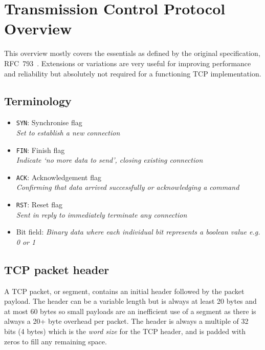 
\section[TCP Overview]{Transmission Control Protocol Overview}
    This overview mostly covers the essentials as defined by the original specification, RFC~793~\cite{rfc793}. Extensions or variations are very useful for improving performance and reliability but absolutely not required for a functioning \gls{TCP} implementation. %

    \subsection{Terminology}
        \begin{itemize}
            \item \texttt{SYN}: Synchronise flag\\
                \textit{Set to establish a new connection}
            \item \texttt{FIN}: Finish flag\\
                \textit{Indicate `no more data to send', closing existing connection}
            \item \texttt{ACK}: Acknowledgement flag\\
                \textit{Confirming that data arrived successfully or acknowledging a command}
            \item \texttt{RST}: Reset flag\\
                \textit{Sent in reply to immediately terminate any connection}
            \item Bit field: \textit{Binary data where each individual bit represents a boolean value e.g. 0 or 1}
        \end{itemize}

    \subsection{TCP packet header}
        A \gls{TCP} packet, or segment, contains an initial header followed by the packet payload. The header can be a variable length but is always at least 20 bytes and at most 60 bytes so small payloads are an inefficient use of a segment as there is always a 20+ byte overhead per packet. The header is always a multiple of 32 bits (4 bytes) which is the \textit{word size} for the \gls{TCP} header, and is padded with zeros to fill any remaining space.

